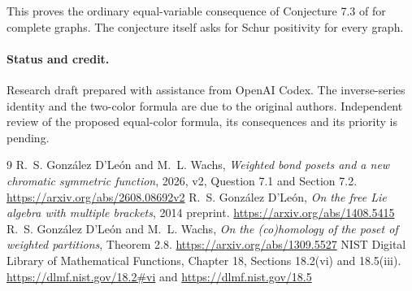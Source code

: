 \documentclass[11pt]{article}
\begin{document}
This proves the ordinary equal-variable consequence of Conjecture 7.3 of \cite{bond}
for complete graphs. The conjecture itself asks for Schur positivity for every graph.

\paragraph{Status and credit.} Research draft prepared with assistance from OpenAI
Codex. The inverse-series identity and the two-color formula are due to the original
authors. Independent review of the proposed equal-color formula, its consequences and
its priority is pending.
\begin{thebibliography}{9}
 R.~S. Gonz\'alez D'Le\'on and M.~L. Wachs,
\emph{Weighted bond posets and a new chromatic symmetric function}, 2026, v2,
Question 7.1 and Section 7.2. \url{https://arxiv.org/abs/2608.08692v2}
 R.~S. Gonz\'alez D'Le\'on, \emph{On the free Lie algebra with
multiple brackets}, 2014 preprint. \url{https://arxiv.org/abs/1408.5415}
 R.~S. Gonz\'alez D'Le\'on and M.~L. Wachs, \emph{On the (co)homology
of the poset of weighted partitions}, Theorem 2.8.
\url{https://arxiv.org/abs/1309.5527}
 NIST Digital Library of Mathematical Functions, Chapter 18,
Sections 18.2(vi) and 18.5(iii).
\url{https://dlmf.nist.gov/18.2#vi} and \url{https://dlmf.nist.gov/18.5}
\end{thebibliography}
\end{document}
